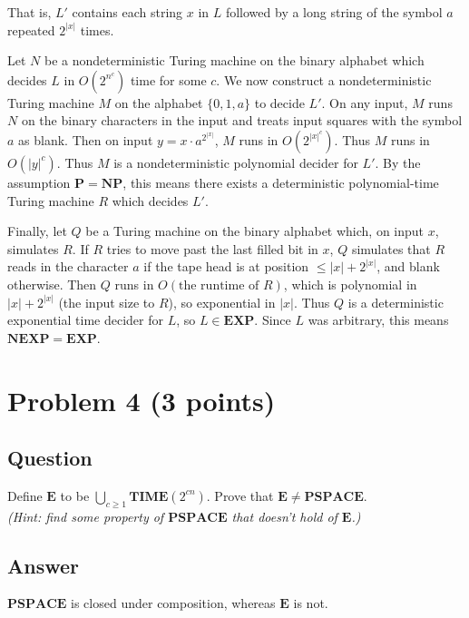 \documentclass{article}
\renewcommand{\P}{\mathbf{P}}
\newcommand{\NP}{\mathbf{NP}}
\newcommand{\EXP}{\mathbf{EXP}}
\newcommand{\NEXP}{\mathbf{NEXP}}
\newcommand{\PSPACE}{\mathbf{PSPACE}}
\newcommand{\TIME}{\mathbf{TIME}}
\newcommand{\E}{\mathbf{E}}
\begin{document}
	That is, $L'$ contains each string $x$ in $L$ followed by a long string of the symbol $a$ repeated $2^{|x|}$ times.
	
	Let $N$ be a nondeterministic Turing machine on the binary alphabet which decides $L$ in $O(2^{n^c})$ time for some $c$.
	We now construct a nondeterministic Turing machine $M$ on the alphabet $\{0, 1, a\}$ to decide $L'$.
	On any input, $M$ runs $N$ on the binary characters in the input and treats input squares with the symbol $a$ as blank.
	Then on input $y = x \cdot a^{2^{|x|}}$, $M$ runs in $O(2^{|x|^c})$.  Thus $M$ runs 
	in $O(|y|^c)$.
	Thus $M$ is a nondeterministic polynomial decider for $L'$.
	By the assumption $\P = \NP$, this means there exists a deterministic polynomial-time Turing machine $R$ which decides $L'$.

	Finally, let $Q$ be a Turing machine on the binary alphabet which, on input $x$, simulates $R$.
	If $R$ tries to move past the last filled bit in $x$, $Q$ simulates that $R$ reads in the character $a$ if the tape head is at position $\leq |x| + 2^{|x|}$, and blank otherwise.
	Then $Q$ runs in $O(\text{the runtime of } R)$, which is polynomial in $|x| + 2^{|x|}$ (the input size to $R$), so exponential in $|x|$.  Thus $Q$ is a deterministic exponential time decider for $L$, so $L \in \EXP$.  Since $L$ was arbitrary, this means $\NEXP = \EXP$.


    \section*{Problem 4 (3 points)}

	\subsection*{Question}
    Define $\mathbf{E}$ to be $\bigcup_{c\ge 1} \TIME(2^{cn})$. Prove that $\mathbf{E} \neq \PSPACE$.\\
    \emph{(Hint: find some property of $\PSPACE$ that doesn't hold of $\mathbf{E}$.)}
	\subsection*{Answer}

	$\PSPACE$ is closed under composition, whereas $\E$ is not.
\end{document}
